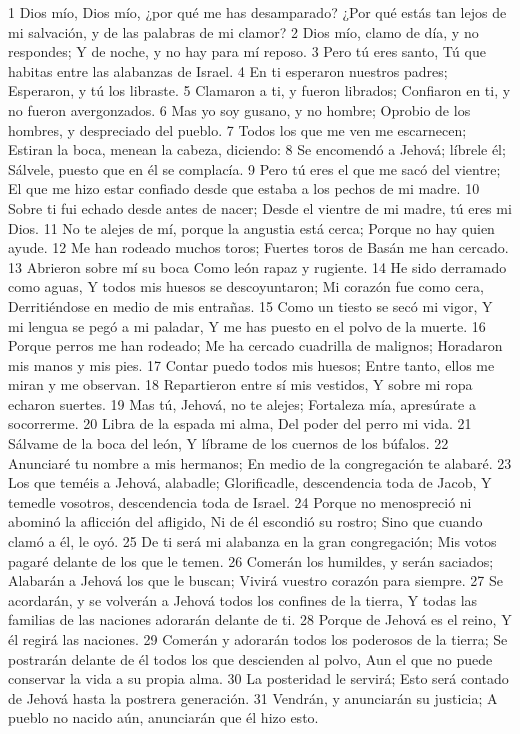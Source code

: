 1 Dios mío, Dios mío, ¿por qué me has desamparado?
¿Por qué estás tan lejos de mi salvación, y de las palabras de mi clamor?
2 Dios mío, clamo de día, y no respondes;
Y de noche, y no hay para mí reposo.
3 Pero tú eres santo,
Tú que habitas entre las alabanzas de Israel.
4 En ti esperaron nuestros padres;
Esperaron, y tú los libraste.
5 Clamaron a ti, y fueron librados;
Confiaron en ti, y no fueron avergonzados.
6 Mas yo soy gusano, y no hombre;
Oprobio de los hombres, y despreciado del pueblo.
7 Todos los que me ven me escarnecen;
Estiran la boca, menean la cabeza,  diciendo:
8 Se encomendó a Jehová; líbrele él;
Sálvele, puesto que en él se complacía.
9 Pero tú eres el que me sacó del vientre;
El que me hizo estar confiado desde que estaba a los pechos de mi madre.
10 Sobre ti fui echado desde antes de nacer;
Desde el vientre de mi madre, tú eres mi Dios.
11 No te alejes de mí, porque la angustia está cerca;
Porque no hay quien ayude.
12 Me han rodeado muchos toros;
Fuertes toros de Basán me han cercado.
13 Abrieron sobre mí su boca
Como león rapaz y rugiente.
14 He sido derramado como aguas,
Y todos mis huesos se descoyuntaron;
Mi corazón fue como cera,
Derritiéndose en medio de mis entrañas.
15 Como un tiesto se secó mi vigor,
Y mi lengua se pegó a mi paladar,
Y me has puesto en el polvo de la muerte.
16 Porque perros me han rodeado;
Me ha cercado cuadrilla de malignos;
Horadaron mis manos y mis pies.
17 Contar puedo todos mis huesos;
Entre tanto, ellos me miran y me observan.
18 Repartieron entre sí mis vestidos,
Y sobre mi ropa echaron suertes.
19 Mas tú, Jehová, no te alejes;
Fortaleza mía, apresúrate a socorrerme.
20 Libra de la espada mi alma,
Del poder del perro mi vida.
21 Sálvame de la boca del león,
Y líbrame de los cuernos de los búfalos.
22 Anunciaré tu nombre a mis hermanos;
En medio de la congregación te alabaré.
23 Los que teméis a Jehová, alabadle;
Glorificadle, descendencia toda de Jacob,
Y temedle vosotros, descendencia toda de Israel.
24 Porque no menospreció ni abominó la aflicción del afligido,
Ni de él escondió su rostro;
Sino que cuando clamó a él, le oyó.
25 De ti será mi alabanza en la gran congregación;
Mis votos pagaré delante de los que le temen.
26 Comerán los humildes, y serán saciados;
Alabarán a Jehová los que le buscan;
Vivirá vuestro corazón para siempre.
27 Se acordarán, y se volverán a Jehová todos los confines de la tierra,
Y todas las familias de las naciones adorarán delante de ti.
28 Porque de Jehová es el reino,
Y él regirá las naciones.
29 Comerán y adorarán todos los poderosos de la tierra;
Se postrarán delante de él todos los que descienden al polvo,
Aun el que no puede conservar la vida a su propia alma.
30 La posteridad le servirá;
Esto será contado de Jehová hasta la postrera generación.
31 Vendrán, y anunciarán su justicia;
A pueblo no nacido aún, anunciarán que él hizo esto.

